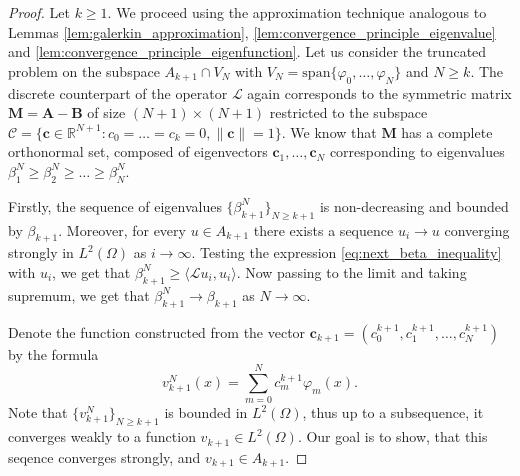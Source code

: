 \documentclass[11pt, a4paper]{article}
\theoremstyle{break}
\theoremstyle{break}
\theoremstyle{break}
\theoremstyle{break}
\theoremstyle{break}
\theoremstyle{break}
\theoremstyle{break}
\theoremstyle{break}
\theoremstyle{break}
\begin{document}
\begin{proof}
    Let $k \geq 1$. We proceed using the approximation technique analogous to Lemmas \ref{lem:galerkin_approximation}, \ref{lem:convergence_principle_eigenvalue} and \ref{lem:convergence_principle_eigenfunction}. Let us consider the truncated problem on the subspace $A_{k+1} \cap V_N$ with $V_N = \text{span}\{\varphi_0, \ldots, \varphi_N\}$ and $N \geq k$. The discrete counterpart of the operator $\mathcal{L}$ again corresponds to the symmetric matrix $\mathbf{M} = \mathbf{A} - \mathbf{B}$ of size $(N+1) \times (N+1)$ restricted to the subspace $\mathcal{C} = \{ \mathbf{c} \in \mathbb{R}^{N+1} : c_0 = \ldots = c_k = 0, \|\mathbf{c}\| = 1\}$. We know that $\mathbf{M}$ has a complete orthonormal set, composed of eigenvectors $\mathbf{c}_1, \ldots, \mathbf{c}_N$ corresponding to eigenvalues $\beta_1^N \geq \beta_2^N \geq \ldots \geq \beta_N^N$. 

    Firstly, the sequence of eigenvalues $\{\beta_{k+1}^N\}_{N \geq k+1}$ is non-decreasing and bounded by $\beta_{k+1}$. Moreover, for every $u \in A_{k+1}$ there exists a sequence $u_i \rightarrow u$ converging strongly in $L^2(\Omega)$ as $i \rightarrow \infty$. Testing the expression \ref{eq:next_beta_inequality} with $u_i$, we get that $\beta_{k+1}^N \geq \langle \mathcal{L} u_i, u_i \rangle$. Now passing to the limit and taking supremum, we get that
    $\beta_{k+1}^N \rightarrow \beta_{k+1}$ as $N \rightarrow \infty$.
    
    Denote the function constructed from the vector $\mathbf{c}_{k+1} = (c_0^{k+1}, c_1^{k+1}, \ldots, c_N^{k+1})$ by the formula
    \begin{equation}
        v_{k+1}^N(x) = \sum_{m=0}^N c^{k+1}_m \varphi_m(x).
    \end{equation}
    Note that $\{v_{k+1}^N\}_{N \geq k+1}$ is bounded in $L^2(\Omega)$, thus up to a subsequence, it converges weakly to a function $v_{k+1} \in L^2(\Omega)$. Our goal is to show, that this seqence converges strongly, and $v_{k+1} \in A_{k+1}$.


\end{proof}
\end{document}
